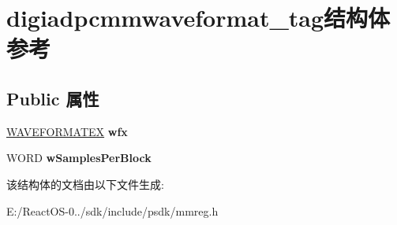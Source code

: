 \hypertarget{structdigiadpcmmwaveformat__tag}{}\section{digiadpcmmwaveformat\+\_\+tag结构体 参考}
\label{structdigiadpcmmwaveformat__tag}
\subsection*{Public 属性}
\begin{DoxyCompactItemize}
\item 
\mbox{\label{structdigiadpcmmwaveformat__tag_aad1328354ddb65d2167c5a136d63fc4f}} 
\hyperlink{struct_w_a_v_e_f_o_r_m_a_t_e_x}{W\+A\+V\+E\+F\+O\+R\+M\+A\+T\+EX} {\bfseries wfx}
\item 
\mbox{\label{structdigiadpcmmwaveformat__tag_a5cd706bad9c1ba6da6333750a5090dfc}} 
W\+O\+RD {\bfseries w\+Samples\+Per\+Block}
\end{DoxyCompactItemize}


该结构体的文档由以下文件生成\+:\begin{DoxyCompactItemize}
\item 
E\+:/\+React\+O\+S-\/0../sdk/include/psdk/mmreg.\+h\end{DoxyCompactItemize}
